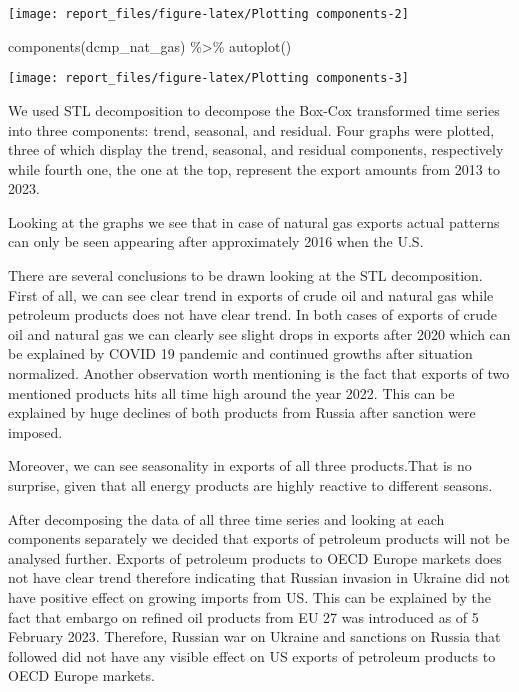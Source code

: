 \documentclass[
]{article}
\newenvironment{Shaded}{\begin{snugshade}}{\end{snugshade}}
\newcommand{\FunctionTok}[1]{\textcolor[rgb]{0.00,0.00,0.00}{#1}}
\newcommand{\NormalTok}[1]{#1}
\newcommand{\SpecialCharTok}[1]{\textcolor[rgb]{0.00,0.00,0.00}{#1}}
\begin{document}
\begin{center}\texttt{[image: report\_files/figure-latex/Plotting components-2]} \end{center}

\begin{Shaded}
\begin{Highlighting}[]
\FunctionTok{components}\NormalTok{(dcmp\_nat\_gas) }\SpecialCharTok{\%\textgreater{}\%} \FunctionTok{autoplot}\NormalTok{()}
\end{Highlighting}
\end{Shaded}

\begin{center}\texttt{[image: report\_files/figure-latex/Plotting components-3]} \end{center}

We used STL decomposition to decompose the Box-Cox transformed time
series into three components: trend, seasonal, and residual. Four graphs
were plotted, three of which display the trend, seasonal, and residual
components, respectively while fourth one, the one at the top, represent
the export amounts from 2013 to 2023.

Looking at the graphs we see that in case of natural gas exports actual
patterns can only be seen appearing after approximately 2016 when the
U.S.

There are several conclusions to be drawn looking at the STL
decomposition. First of all, we can see clear trend in exports of crude
oil and natural gas while petroleum products does not have clear trend.
In both cases of exports of crude oil and natural gas we can clearly see
slight drops in exports after 2020 which can be explained by COVID 19
pandemic and continued growths after situation normalized. Another
observation worth mentioning is the fact that exports of two mentioned
products hits all time high around the year 2022. This can be explained
by huge declines of both products from Russia after sanction were
imposed.

Moreover, we can see seasonality in exports of all three products.That
is no surprise, given that all energy products are highly reactive to
different seasons.

After decomposing the data of all three time series and looking at each
components separately we decided that exports of petroleum products will
not be analysed further. Exports of petroleum products to OECD Europe
markets does not have clear trend therefore indicating that Russian
invasion in Ukraine did not have positive effect on growing imports from
US. This can be explained by the fact that embargo on refined oil
products from EU 27 was introduced as of 5 February 2023. Therefore,
Russian war on Ukraine and sanctions on Russia that followed did not
have any visible effect on US exports of petroleum products to OECD
Europe markets.
\end{document}
